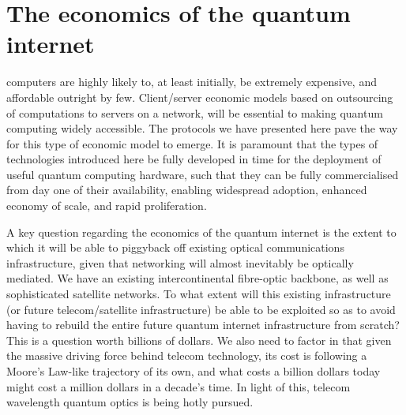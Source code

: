 \section{The economics of the quantum internet} \label{sec:economics} 

\newline

\newline

 computers are highly likely to, at least initially, be extremely expensive, and affordable outright by few. Client/server economic models based on outsourcing of computations to servers on a network, will be essential to making quantum computing widely accessible. The protocols we have presented here pave the way for this type of economic model to emerge. It is paramount that the types of technologies introduced here be fully developed in time for the deployment of useful quantum computing hardware, such that they can be fully commercialised from day one of their availability, enabling widespread adoption, enhanced economy of scale, and rapid proliferation.

A key question regarding the economics of the quantum internet is the extent to which it will be able to piggyback off existing optical communications infrastructure, given that networking will almost inevitably be optically mediated. We have an existing intercontinental fibre-optic backbone, as well as sophisticated satellite networks. To what extent will this existing infrastructure (or future telecom/satellite infrastructure) be able to be exploited so as to avoid having to rebuild the entire future quantum internet infrastructure from scratch? This is a question worth billions of dollars. We also need to factor in that given the massive driving force behind telecom technology, its cost is following a Moore's Law-like trajectory of its own, and what costs a billion dollars today might cost a million dollars in a decade's time. In light of this, telecom wavelength quantum optics is being hotly pursued.


